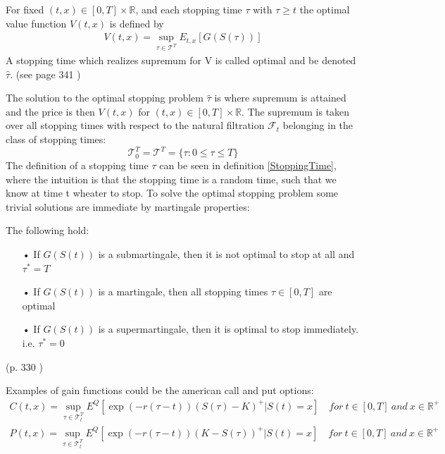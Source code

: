 \theoremstyle{definition}
\begin{definition}{}\label{optValFunc}
For fixed $(t,x)\in [0,T] \times \mathbb{R}$, and each stopping time $\tau$ with $\tau\geq t$ the optimal value function $V(t,x)$ is defined by
\begin{align}
V(t,x)= \sup_{\tau \in \mathcal{T}^T} E_{t,x}[G(S(\tau))]
\end{align}
A stopping time which realizes supremum for V is called optimal and be denoted $\hat{\tau}$.
(see page 341 \parencite{finKont})
\end{definition}

The solution to the optimal stopping problem $\hat{\tau}$ is where supremum is attained and the price is then $V(t,x)$ for $(t,x)\in [0,T] \times \mathbb{R}$. The supremum is taken over all stopping times with respect to the natural filtration $\mathcal{F}_{t}$ belonging in the class of stopping times:
$$\mathcal{T}_0^T=\mathcal{T}^T=\{\tau : 0 \leq \tau \leq T \}$$
The definition of a stopping time $\tau$ can be seen in definition \ref{StoppingTime}, where the intuition is that the stopping time is a random time, such that we know at time t wheater to stop. To solve the optimal stopping problem some trivial solutions are immediate by martingale properties:
\begin{proposition}\label{TrivialMG}
The following hold:
\begin{enumerate}
\item[•] If $G(S(t))$ is a submartingale, then it is not optimal to stop at all and $\tau^*=T$
\item[•] If $G(S(t))$ is a martingale, then all stopping times $\tau\in [0,T]$ are optimal
\item[•] If $G(S(t))$ is a supermartingale, then it is optimal to stop immediately. i.e. $\tau^*=0$
\end{enumerate}
(p. 330 \parencite{finKont})
\end{proposition}

Examples of gain functions could be the american call and put options:
\begin{align}
C(t,x)=\sup_{\tau \in \mathcal{T}_t^T} E^Q[\exp(-r(\tau-t)) (S(\tau)-K)^+|S(t)=x] \quad for \ t\in [0,T] \ and \ x\in\mathbb{R}^+\\
P(t,x)=\sup_{\tau \in \mathcal{T}_t^T} E^Q[\exp(-r(\tau-t)) (K-S(\tau))^+|S(t)=x] \quad for \ t\in [0,T] \ and \ x\in\mathbb{R}^+
\end{align}


